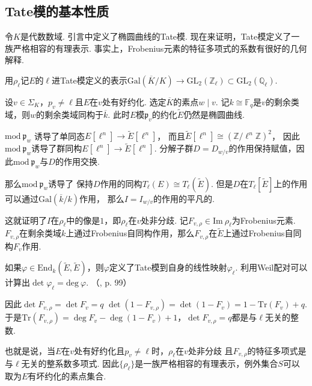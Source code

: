 \subsection{Tate模的基本性质}

令$K$是代数数域.
引言中定义了椭圆曲线的Tate模.
现在来证明，Tate模定义了一族严格相容的有理表示. 事实上，Frobenius元素的特征多项式的系数有很好的几何解释.

用$\rho_{\ell}$记$E$的$\ell$进Tate模定义的表示$\mathrm{Gal}(\overline{K}/K)\to \mathrm{GL}_2(\mathbb{Z}_{\ell})\subset \mathrm{GL}_2(\mathbb{Q}_{\ell})$.

设$v\in \Sigma_K$，$p_v\neq \ell$且$E$在$v$处有好约化. 选定$\overline{K}$的素点$w\mid v$.
记$k\cong \mathbb{F}_q$是$v$的剩余类域，则$w$的剩余类域同构于$\overline{k}$.
此时$E$模$\mathfrak{p}_v$的约化$\tilde{E}$仍然是椭圆曲线.

$\mathrm{mod}\ \mathfrak{p}_{w}$
诱导了单同态$E[\ell^n]\to \tilde{E}[\ell^n]$，
而且$\tilde{E}[\ell^n]\cong (\mathbb{Z}/\ell^n \mathbb{Z})^2$，
因此$\mathrm{mod}\ \mathfrak{p}_{w}$诱导了群同构$E[\ell^n]\to \tilde{E}[\ell^n]$.
分解子群$D=D_{w/v}$的作用保持赋值，因此$\mathrm{mod}\ \mathfrak{p}_{w}$与$D$的作用交换.

那么$\mathrm{mod}\ \mathfrak{p}_{w}$诱导了
保持$D$作用的同构$T_{\ell}(E)\cong T_{\ell}(\tilde{E})$.
但是$D$在$T_{\ell}[\tilde{E}]$上的作用可以通过$\mathrm{Gal}(\overline{k}/k)$作用，
那么$I=I_{w/v}$的作用的平凡的.

这就证明了$I$在$\rho_{\ell}$中的像是$1$，即$\rho_{\ell}$在$v$处非分歧.
记$F_{v,\rho}\in \mathrm{Im}\ \rho_{\ell}$为Frobenius元素.
$F_{v,\rho}$在剩余类域$k$上通过Frobenius自同构作用，那么$F_{v,\rho}$在$\tilde{E}$上通过Frobenius自同构$F_v$作用.

如果$\varphi\in\mathrm{End}_{k}(\tilde{E}, \tilde{E})$，则$\varphi$定义了Tate模到自身的线性映射$\varphi_{\ell}$.
利用Weil配对可以计算出$\det \varphi_{\ell} = \mathrm{deg}\ \varphi$.
（\parencite{silverman2009arithmetic}, p. 99）

因此$\det F_{v,\rho} = \det F_v = q$
$\det (1-F_{v,\rho}) = \det (1-F_v) = 1 - \mathrm{Tr}(F_v) + q$.
于是$\mathrm{Tr}(F_{v,\rho}) = \deg F_v - \deg (1-F_v) + 1$，$\det F_{v,\rho} = q$都是与$\ell$无关的整数.

也就是说，当$E$在$v$处有好约化且$p_v\neq \ell$时，$\rho_{\ell}$在$v$处非分歧
且$F_{v,\rho}$的特征多项式是与$\ell$无关的整系数多项式.
因此$\{\rho_{\ell}\}$是一族严格相容的有理表示，例外集合$S$可以取为$E$有坏约化的素点集合.


